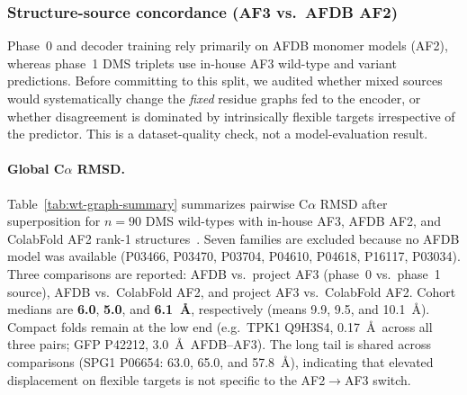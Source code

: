 \documentclass[11pt,a4paper]{article}
\begin{document}
\subsubsection{Structure-source concordance (AF3 vs.\ AFDB AF2)}
\label{sec:wt-structure-concordance}
Phase~0 and decoder training rely primarily on AFDB monomer models (AF2), whereas phase~1 DMS triplets use in-house AF3 wild-type and variant predictions. Before committing to this split, we audited whether mixed sources would systematically change the \emph{fixed} residue graphs fed to the encoder, or whether disagreement is dominated by intrinsically flexible targets irrespective of the predictor. This is a dataset-quality check, not a model-evaluation result.

\paragraph{Global C$\alpha$ RMSD.}
Table~\ref{tab:wt-graph-summary} summarizes pairwise C$\alpha$ RMSD after superposition for $n{=}90$ DMS wild-types with in-house AF3, AFDB AF2, and ColabFold AF2 rank-1 structures~\cite{mirdita2022colabfold}. Seven families are excluded because no AFDB model was available (P03466, P03470, P03704, P04610, P04618, P16117, P03034). Three comparisons are reported: AFDB vs.\ project AF3 (phase~0 vs.\ phase~1 source), AFDB vs.\ ColabFold AF2, and project AF3 vs.\ ColabFold AF2. Cohort medians are \textbf{6.0}, \textbf{5.0}, and \textbf{6.1~\AA}, respectively (means 9.9, 9.5, and 10.1~\AA). Compact folds remain at the low end (e.g.\ TPK1 Q9H3S4, 0.17~\AA\ across all three pairs; GFP P42212, 3.0~\AA\ AFDB--AF3). The long tail is shared across comparisons (SPG1 P06654: 63.0, 65.0, and 57.8~\AA), indicating that elevated displacement on flexible targets is not specific to the AF2$\rightarrow$AF3 switch.
\end{document}
